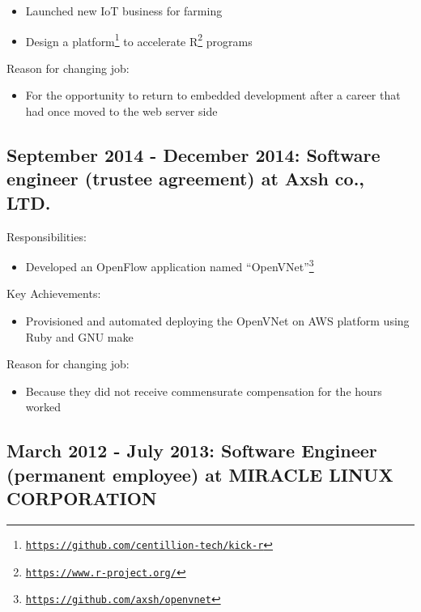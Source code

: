 \documentclass[letterpaper]{article}
\begin{document}
\begin{itemize}
  \item Launched new IoT business for farming
  \item Design a platform\footnote{\href{https://github.com/centillion-tech/kick-r}{\tt https://github.com/centillion-tech/kick-r}} to accelerate R\footnote{\href{https://www.r-project.org/}{\tt https://www.r-project.org/}} programs
\end{itemize}

\noindent Reason for changing job:

\begin{itemize}
  \item For the opportunity to return to embedded development after a career that had once moved to the web server side
\end{itemize}

\subsection*{September 2014 - December 2014: Software engineer (trustee agreement) at Axsh co., LTD.}

\noindent Responsibilities:

\begin{itemize}
  \item Developed an OpenFlow application named ``OpenVNet''\footnote{\href{https://github.com/axsh/openvnet}{\tt https://github.com/axsh/openvnet}}
\end{itemize}

\noindent Key Achievements:

\begin{itemize}
  \item Provisioned and automated deploying the OpenVNet on AWS platform using Ruby and GNU make
\end{itemize}

\noindent Reason for changing job:

\begin{itemize}
  \item Because they did not receive commensurate compensation for the hours worked
\end{itemize}

\subsection*{March 2012 - July 2013: Software Engineer (permanent employee) at MIRACLE LINUX CORPORATION}
\end{document}
